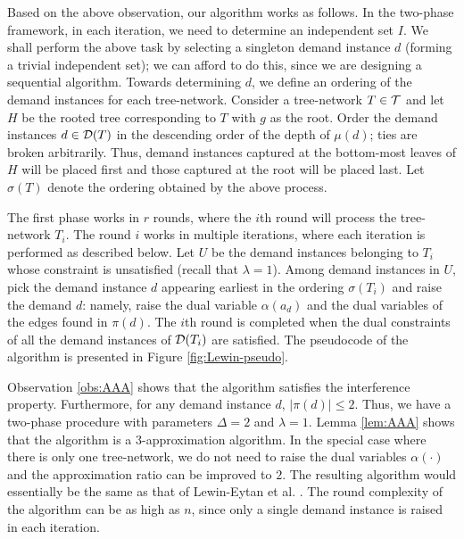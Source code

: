 \documentclass[11pt]{article}
\newcommand{\calT} {{\cal T}}
\newcommand{\calD} {{\cal D}}
\begin{document}
Based on the above observation, our algorithm works as follows.
In the two-phase framework, in each iteration, we need to determine an independent set $I$.
We shall perform the above task by selecting a singleton demand instance $d$ (forming a trivial independent set);
we can afford to do this, since we are designing a sequential algorithm.
Towards determining $d$, we define an ordering of the demand instances for each tree-network.
Consider a tree-network $T\in \calT$ and let $H$ be the rooted tree corresponding to $T$ with $g$ as the root. 
Order the demand instances $d\in \calD(T)$ in the descending order of the depth of $\mu(d)$;
ties are broken arbitrarily. Thus, demand instances captured at the bottom-most leaves of $H$ will 
be placed first and those captured at the root will be placed last.
Let $\sigma(T)$ denote the ordering obtained by the above process.

The first phase works in $r$ rounds, where the $i$th round will process the tree-network $T_i$.
The round $i$ works in multiple iterations, where each iteration is performed as described below.
Let $U$ be the demand instances belonging to $T_i$ whose constraint is unsatisfied (recall that $\lambda=1$).
Among demand instances in $U$, pick the demand instance $d$ appearing earliest in the ordering $\sigma(T_i)$
and raise the demand $d$: namely, raise the dual variable $\alpha(a_d)$ and the dual variables
of the edges found in $\pi(d)$. The $i$th round is completed when the dual constraints of 
all the demand instances of $\calD(T_i)$ are satisfied.
The pseudocode of the algorithm is presented in Figure \ref{fig:Lewin-pseudo}.

Observation \ref{obs:AAA} shows that the algorithm satisfies the interference property.
Furthermore, for any demand instance $d$, $|\pi(d)|\leq 2$.
Thus, we have a two-phase procedure with parameters $\Delta=2$ and $\lambda=1$.
Lemma \ref{lem:AAA} shows that the algorithm is a $3$-approximation algorithm.
In the special case where there is only one tree-network, we do not need to raise
the dual variables $\alpha(\cdot)$ and the approximation ratio can be improved to $2$.
The resulting algorithm would essentially be the same as that of Lewin-Eytan et al. \cite{Lewin-Eytan}.
The round complexity of the algorithm can be as high as $n$, since only a single demand instance is 
raised in each iteration. 
\end{document}
